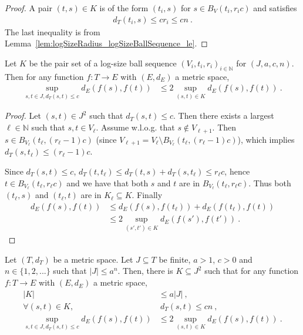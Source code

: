 \begin{proof}
  \leanok
A pair $(t, s) \in K$ is of the form $(t_i, s)$ for $s \in B_V(t_i, r_i c)$ and satisfies
\begin{align*}
  d_T(t_i, s) \le c r_i \le c n \: .
\end{align*}
The last inequality is from Lemma~\ref{lem:logSizeRadius_logSizeBallSequence_le}.
\end{proof}


\begin{lemma}\label{lem:sup_dist_le_two_mul_sup_dist_pairSet}
  \leanok
Let $K$ be the pair set of a log-size ball sequence $(V_i, t_i, r_i)_{i \in \mathbb{N}}$ for $(J, a, c, n)$.
Then for any function $f : T \to E$ with $(E,d_E)$ a metric space,
\begin{align*}
  \sup_{s,t\in J, d_T(s,t) \le c} d_E(f(s), f(t))
  & \le 2 \sup_{(s,t) \in K} d_E(f(s), f(t))
  \: .
\end{align*}
\end{lemma}

\begin{proof}
\leanok
Let $(s, t) \in J^2$ such that $d_T(s, t) \le c$.
Then there exists a largest $\ell \in \mathbb{N}$ such that $s, t \in V_\ell$.
Assume w.l.o.g. that $s \notin V_{\ell + 1}$. Then $s \in B_{V_\ell}(t_\ell, (r_\ell-1)c)$ (since $V_{\ell + 1} = V_\ell \setminus B_{V_\ell}(t_\ell, (r_\ell-1)c)$), which implies $d_T(s, t_\ell) \le (r_\ell - 1)c$.

Since $d_T(s, t) \le c$, $d_T(t, t_\ell) \le d_T(t, s) + d_T(s, t_\ell) \le r_\ell c$, hence $t \in B_{V_\ell}(t_\ell, r_\ell c)$ and we have that both $s$ and $t$ are in $B_{V_\ell}(t_\ell, r_\ell c)$.
Thus both $(t_\ell, s)$ and $(t_\ell, t)$ are in $K_\ell \subseteq K$.
Finally
\begin{align*}
  d_E(f(s), f(t))
  &\le d_E(f(s), f(t_\ell)) + d_E(f(t_\ell), f(t))
  \\
  &\le 2\sup_{(s',t') \in K} d_E(f(s'), f(t'))
  \: .
\end{align*}
\end{proof}


\begin{lemma}\label{lem:pair_reduction}
  \leanok
Let $(T,d_T)$ be a metric space.
Let $J \subseteq T$ be finite, $a > 1$, $c>0$ and $n \in \{1, 2, ...\}$ such that $|J| \le a^n$.
Then, there is $K \subseteq J^2$ such that for any function $f : T \to E$ with $(E,d_E)$ a metric space,
\begin{align}
  |K|
  & \le a |J|
  \:, \label{eq:chain1} \\
  \forall (s,t) \in K,
  &\:  d_T(s,t) \le c n
  \:, \label{eq:chain2} \\
  \sup_{s,t\in J, d_T(s,t) \le c} d_E(f(s), f(t))
  & \le 2 \sup_{(s,t) \in K} d_E(f(s), f(t))
  \: . \label{eq:chain3}
\end{align}
\end{lemma}

